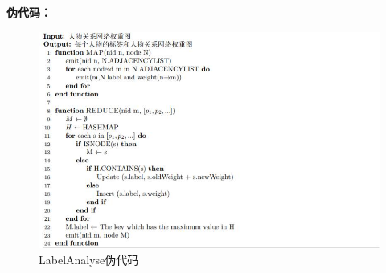 \documentclass[a4paper,UTF8]{article}
\numberwithin{equation}{section}
\begin{document}
\textbf{伪代码：}\par
\begin{figure}[H]
    \centering

    \includegraphics[width = 15cm]{5-2code.jpg}

    \caption{LabelAnalyse伪代码}
\end{figure}
\end{document}
